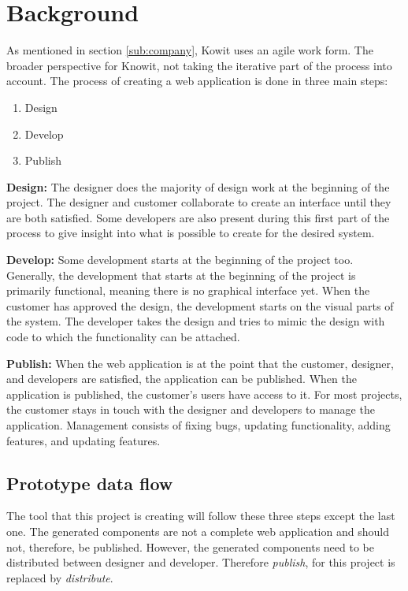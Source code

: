 \newpage
\section{Background}
As mentioned in section \ref{sub:company}, Kowit uses an agile work form. The broader perspective for Knowit, not taking the iterative part of the process into account. The process of creating a web application is done in three main steps: 
\begin{enumerate}
  \item Design
  \item Develop 
  \item Publish
\end{enumerate}

\textbf{Design:} The designer does the majority of design work at the beginning of the project. The designer and customer collaborate to create an interface until they are both satisfied.  Some developers are also present during this first part of the process to give insight into what is possible to create for the desired system.

\textbf{Develop:} Some development starts at the beginning of the project too. Generally, the development that starts at the beginning of the project is primarily functional, meaning there is no graphical interface yet. When the customer has approved the design, the development starts on the visual parts of the system. The developer takes the design and tries to mimic the design with code to which the functionality can be attached.  

\textbf{Publish:} When the web application is at the point that the customer, designer, and developers are satisfied, the application can be published. When the application is published, the customer's users have access to it. For most projects, the customer stays in touch with the designer and developers to manage the application. Management consists of fixing bugs, updating functionality, adding features, and updating features.

\subsection{Prototype data flow}%
\label{sub:Prototype data flow}
The tool that this project is creating will follow these three steps except the last one. The generated components are not a complete web application and should not, therefore, be published. However, the generated components need to be distributed between designer and developer. Therefore \textit{publish}, for this project is replaced by \textit{distribute}. 

